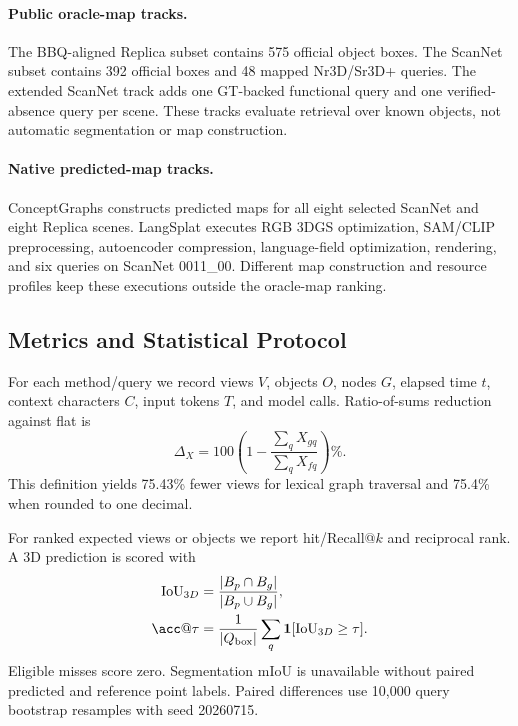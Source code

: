 \documentclass[10pt,twocolumn,letterpaper]{article}
\begin{document}
\paragraph{Public oracle-map tracks.}
The BBQ-aligned Replica subset contains 575 official object boxes. The ScanNet
subset contains 392 official boxes and 48 mapped Nr3D/Sr3D+ queries. The
extended ScanNet track adds one GT-backed functional query and one
verified-absence query per scene. These tracks evaluate retrieval over known
objects, not automatic segmentation or map construction.

\paragraph{Native predicted-map tracks.}
ConceptGraphs constructs predicted maps for all eight selected ScanNet and
eight Replica scenes. LangSplat executes RGB 3DGS optimization, SAM/CLIP
preprocessing, autoencoder compression, language-field optimization,
rendering, and six queries on ScanNet 0011\_00. Different map construction and
resource profiles keep these executions outside the oracle-map ranking.

\subsection{Metrics and Statistical Protocol}
For each method/query we record views $V$, objects $O$, nodes $G$, elapsed time
$t$, context characters $C$, input tokens $T$, and model calls. Ratio-of-sums
reduction against flat is
\begin{equation}
\Delta_X=100\left(1-\frac{\sum_qX_{gq}}{\sum_qX_{fq}}\right)\%.
\end{equation}
This definition yields 75.43\% fewer views for lexical graph traversal and
75.4\% when rounded to one decimal.

For ranked expected views or objects we report hit/Recall@$k$ and reciprocal
rank. A 3D prediction is scored with
\begin{align}
\mathrm{IoU}_{3D}&=\frac{|B_p\cap B_g|}{|B_p\cup B_g|},\\
\acc@\tau&=\frac{1}{|Q_{\mathrm{box}}|}
\sum_q\mathbf{1}[\mathrm{IoU}_{3D}\geq\tau].
\end{align}
Eligible misses score zero. Segmentation mIoU is unavailable without paired
predicted and reference point labels. Paired differences use 10,000 query
bootstrap resamples with seed 20260715.
\end{document}
